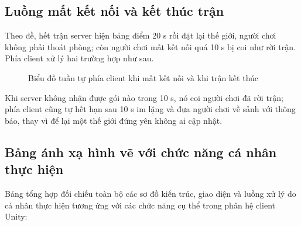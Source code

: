 \subsection{Luồng mất kết nối và kết thúc trận}
Theo đề, hết trận server hiện bảng điểm 20 s rồi đặt lại thế giới, người chơi không phải thoát phòng; còn người chơi mất
kết nối quá 10 s bị coi như rời trận. Phía client xử lý hai trường hợp như sau.
\begin{figure}[H]
\centering
\renewcommand{\seqstep}{0.64cm}
\caption{Biểu đồ tuần tự phía client khi mất kết nối và khi trận kết thúc}
\label{fig:A-luong-roi}
\end{figure}
Khi server không nhận được gói nào trong 10 s, nó coi người chơi đã rời trận; phía client cũng tự hết hạn sau 10 s im lặng và
đưa người chơi về sảnh với thông báo, thay vì để lại một thế giới đứng yên không ai cập nhật.

\subsection{Bảng ánh xạ hình vẽ với chức năng cá nhân thực hiện}
\label{sec:A-mapping-hinh-ve}
Bảng tổng hợp đối chiếu toàn bộ các sơ đồ kiến trúc, giao diện và luồng xử lý do cá nhân thực hiện tương ứng với các chức năng cụ thể trong phân hệ client Unity:

